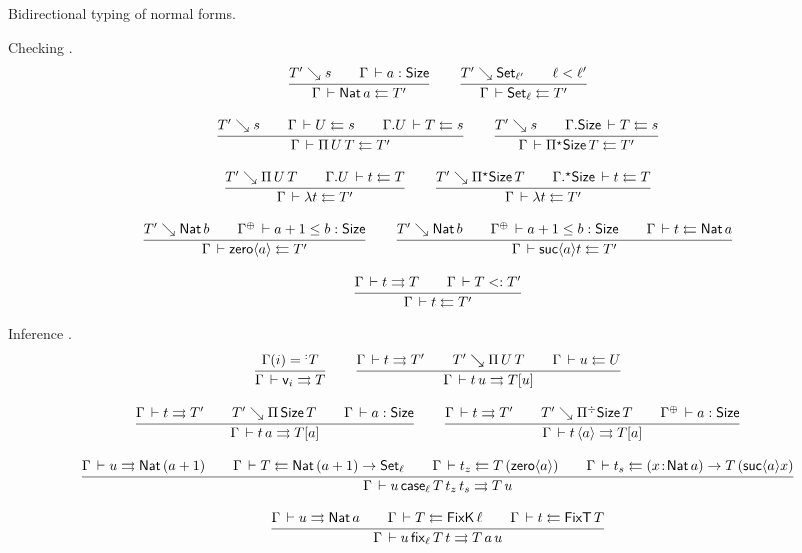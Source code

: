 \documentclass[acmlarge,review,anonymous]{acmart}\settopmatter{printfolios=true}
\begin{document}
Bidirectional typing of normal forms.

Checking .
\begin{gather*}
  \ru{T' \evalsto s \qquad
      \Gamma \der a : \Size
    }{\Gamma \der \Nat a \jchk T'}
\qquad
  \ru{T' \evalsto \Set[\ell'] \qquad \ell < \ell'
    }{\Gamma \der \Set[\ell] \jchk T'}
\\[2ex]
  \ru{T' \evalsto s \qquad
      \Gamma \der U \jchk s \qquad
      \cext \Gamma U \der T \jchk s
    }{\Gamma \der \piT U T \jchk T'}
\qquad
  \ru{T' \evalsto s \qquad
      \cext \Gamma \Size \der T \jchk s
    }{\Gamma \der \epiT \Size T \jchk T'}
\\[2ex]
  \ru{T' \evalsto \piT U T \qquad
      \cext \Gamma U \der t \jchk T
    }{\Gamma \der \lambda t \jchk T'}
\qquad
  \ru{T' \evalsto \epiT \Size T \qquad
      \eext \Gamma \Size \der t \jchk T
    }{\Gamma \der \lambda t \jchk T'}
\\[2ex]
  \ru{T' \evalsto \Nat b \qquad
      \resurrect \Gamma \der a+1 \leq b : \Size
    }{\Gamma \der \zero a \jchk T'}
\qquad
  \ru{T' \evalsto \Nat b \qquad
      \resurrect \Gamma \der a+1 \leq b : \Size \qquad
      \Gamma \der t \jchk \Nat a
    }{\Gamma \der \suc a t \jchk T'}
\\[2ex]
  \ru{\Gamma \der t \jinf T \qquad \Gamma \der T \asub T'
    }{\Gamma \der t \jchk T'}
\end{gather*}

Inference .
\begin{gather*}
  \ru{\Gamma(i) = \erann[\noterased] T
    }{\Gamma \der \ind i \jinf T}
\qquad
  \ru{\Gamma \der t \jinf T' \qquad
      T' \evalsto \piT U T \qquad
      \Gamma \der u \jchk U
    }{\Gamma \der t\, u \jinf T[u]}
\\[2ex]
  \ru{\Gamma \der t \jinf T' \qquad
      T' \evalsto \piT \Size T \qquad
      \Gamma \der a : \Size
    }{\Gamma \der t\,a \jinf T[a]}
\qquad
  \ru{\Gamma \der t \jinf T' \qquad
      T' \evalsto \erpiT \Size T \qquad
      \resurrect\Gamma \der a : \Size
    }{\Gamma \der t\,\ann a \jinf T[a]}
\\[2ex]
  \ru{\Gamma \der u \jinf \Nat (a+1) \qquad
      \Gamma \der T \jchk \Nat (a+1) \to \Set[\ell] \qquad
      \Gamma \der t_z \jchk T\,(\zero a) \qquad
      \Gamma \der t_s \jchk \funT x {\Nat a} {T\,(\suc a x)}
    }{\Gamma \der u\, \case[\ell] T {t_z} {t_s} \jinf T\,u}
\\[2ex]
  \ru{\Gamma \der u \jinf \Nat a \qquad
      \Gamma \der T \jchk \FixK\,\ell \qquad
      \Gamma \der t \jchk \FixT\,T
    }{\Gamma \der u\, \fix[\ell] T t \jinf T\,a\,u}
\end{gather*}
\end{document}
